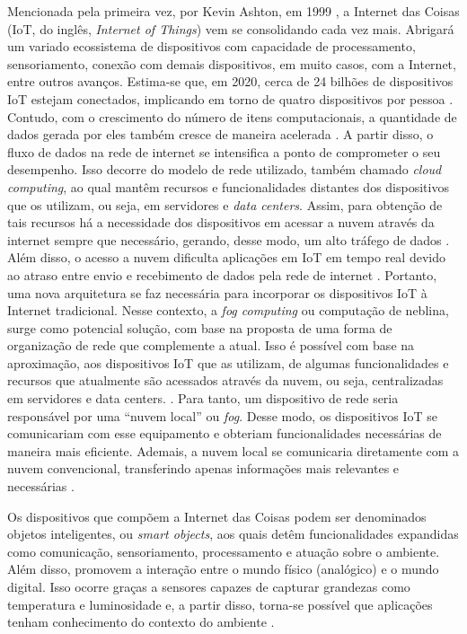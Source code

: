 Mencionada pela primeira vez, por Kevin Ashton, em 1999 \cite{Finep2015}, a Internet das Coisas (IoT, do inglês, \textit{Internet of Things}) vem se consolidando cada vez mais. Abrigará um variado ecossistema de dispositivos com capacidade de processamento, sensoriamento, conexão com demais dispositivos, em muito casos, com a Internet, entre outros avanços. Estima-se que, em 2020, cerca de 24 bilhões de dispositivos IoT estejam conectados, implicando em torno de quatro dispositivos por pessoa \cite{Meola2016}.   
Contudo, com o crescimento do número de itens computacionais, a quantidade de dados gerada por eles também cresce de maneira acelerada \cite{Chiang2016}. A partir disso, o fluxo de dados na rede de internet se intensifica a ponto de comprometer o seu desempenho. Isso decorre do modelo de rede utilizado, também chamado \textit{cloud computing}, ao qual mantêm recursos e funcionalidades distantes dos dispositivos que os utilizam, ou seja, em servidores e \textit{data centers}. Assim, para obtenção de tais recursos há a necessidade dos dispositivos em acessar a nuvem através da internet sempre que necessário, gerando, desse modo, um alto tráfego de dados \cite{Vaquero2014}. 
Além disso, o acesso a nuvem dificulta aplicações em IoT em tempo real devido ao atraso entre envio e recebimento de dados pela rede de internet \cite{Syed2016}.
Portanto, uma nova arquitetura se faz necessária para incorporar os dispositivos IoT à Internet tradicional. 
Nesse contexto, a \textit{fog computing} ou computação de neblina, surge como potencial solução, com base na proposta de uma forma de organização de rede que complemente a atual. Isso é possível com base na aproximação, aos dispositivos IoT que as utilizam, de algumas funcionalidades e recursos que atualmente são acessados através da nuvem, ou seja, centralizadas em servidores e data centers.
\cite{Chiang2016}. Para tanto, um dispositivo de rede seria responsável por uma ``nuvem local'' ou \textit{fog}. Desse modo, os dispositivos IoT se comunicariam com esse equipamento e obteriam funcionalidades necessárias de maneira mais eficiente. Ademais, a nuvem local se comunicaria diretamente com a nuvem convencional, transferindo apenas informações mais relevantes e necessárias \cite{Syed2016}.

Os dispositivos que compõem a Internet das Coisas podem ser denominados objetos inteligentes, ou \textit{smart objects}, aos quais detêm funcionalidades expandidas como comunicação, sensoriamento, processamento e atuação sobre o ambiente. Além disso, promovem a interação entre o mundo físico (analógico) e o mundo digital. Isso ocorre graças a sensores capazes de capturar grandezas como temperatura e luminosidade e, a partir disso, torna-se possível que aplicações tenham conhecimento do contexto do ambiente \cite{Stojkoska2017}. 

